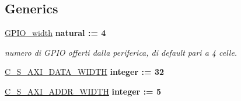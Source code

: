 \subsection*{Generics}
 \begin{DoxyCompactItemize}
\item 
\hypertarget{group___a_x_i-internal_ga0b52ca75e9a6093b2b60d5e851803069}{\hyperlink{group___a_x_i-internal_ga0b52ca75e9a6093b2b60d5e851803069}{G\+P\+I\+O\+\_\+width} {\bfseries {\bfseries \textcolor{vhdlchar}{natural}\textcolor{vhdlchar}{ }\textcolor{vhdlchar}{ }\textcolor{vhdlchar}{\+:}\textcolor{vhdlchar}{=}\textcolor{vhdlchar}{ }\textcolor{vhdlchar}{ } \textcolor{vhdldigit}{4} \textcolor{vhdlchar}{ }}}}\label{group___a_x_i-internal_ga0b52ca75e9a6093b2b60d5e851803069}

\begin{DoxyCompactList}\small\item\em numero di G\+P\+I\+O offerti dalla periferica, di default pari a 4 celle. \end{DoxyCompactList}\item 
\hypertarget{group___a_x_i-internal_ga0fad312acd1f302ce7de30c5658df0bd}{\hyperlink{group___a_x_i-internal_ga0fad312acd1f302ce7de30c5658df0bd}{C\+\_\+\+S\+\_\+\+A\+X\+I\+\_\+\+D\+A\+T\+A\+\_\+\+W\+I\+D\+T\+H} {\bfseries {\bfseries \textcolor{vhdlchar}{integer}\textcolor{vhdlchar}{ }\textcolor{vhdlchar}{ }\textcolor{vhdlchar}{\+:}\textcolor{vhdlchar}{=}\textcolor{vhdlchar}{ }\textcolor{vhdlchar}{ } \textcolor{vhdldigit}{32} \textcolor{vhdlchar}{ }}}}\label{group___a_x_i-internal_ga0fad312acd1f302ce7de30c5658df0bd}

\item 
\hypertarget{group___a_x_i-internal_ga9abff2eaa069440f3b7d9e9937d5ee8e}{\hyperlink{group___a_x_i-internal_ga9abff2eaa069440f3b7d9e9937d5ee8e}{C\+\_\+\+S\+\_\+\+A\+X\+I\+\_\+\+A\+D\+D\+R\+\_\+\+W\+I\+D\+T\+H} {\bfseries {\bfseries \textcolor{vhdlchar}{integer}\textcolor{vhdlchar}{ }\textcolor{vhdlchar}{ }\textcolor{vhdlchar}{\+:}\textcolor{vhdlchar}{=}\textcolor{vhdlchar}{ }\textcolor{vhdlchar}{ } \textcolor{vhdldigit}{5} \textcolor{vhdlchar}{ }}}}\label{group___a_x_i-internal_ga9abff2eaa069440f3b7d9e9937d5ee8e}

\end{DoxyCompactItemize}
